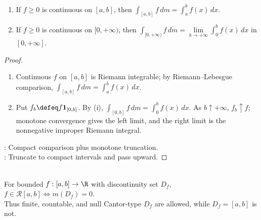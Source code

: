 \begin{corollary} \label{cor:nonnegative-continuous-lebesgue-riemann} 
\begin{enumerate}[label=(\roman*)]
\setlength{\itemsep}{0pt}
\item If $f\geq0$ is continuous on $[a,b]$, then $\int_{[a,b]}f\,dm=\int_a^bf(x)\,dx$.
\item If $f\geq0$ is continuous on $[0,+\infty)$, then $\int_{[0,+\infty)}f\,dm=\lim\limits_{b\to+\infty}\int_0^bf(x)\,dx$ in $[0,+\infty]$.
\end{enumerate}
\begin{proof}
\begin{enumerate}[label=(\roman*)]
\setlength{\itemsep}{0pt}
\item Continuous $f$ on $[a,b]$ is Riemann integrable; by Riemann--Lebesgue comparison, $\int_{[a,b]}f\,dm=\int_a^bf(x)\,dx$.
\item Put $f_b\defeq f\mathbf{1}_{[0,b]}$. By (i), $\int_{[0,b]}f\,dm=\int_0^bf(x)\,dx$. As $b\uparrow+\infty$, $f_b\uparrow f$; monotone convergence gives the left limit, and the right limit is the nonnegative improper Riemann integral.
\end{enumerate}
: Compact comparison plus monotone truncation.\\
: Truncate to compact intervals and pass upward.
\end{proof}
\end{corollary}

\begin{perspective} \label{per:lebesgue-criterion-riemann-roadmap} \\
For bounded $f:[a,b]\to\R$ with discontinuity set $D_f$, $f\in\mathcal{R}[a,b]\Longleftrightarrow m(D_f)=0$.\\
Thus finite, countable, and null Cantor-type $D_f$ are allowed, while $D_f=[a,b]$ is not.
\end{perspective}

